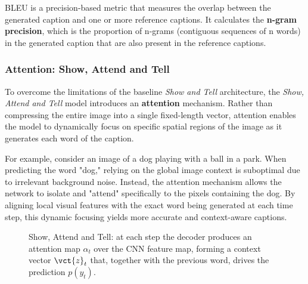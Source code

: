 BLEU is a precision-based metric that measures the overlap between the generated caption and one or more reference captions.
It calculates the \textbf{n-gram precision}, which is the proportion of n-grams (contiguous sequences of n words)
in the generated caption that are also present in the reference captions.


\subsubsection{Attention: Show, Attend and Tell}

To overcome the limitations of the baseline \textit{Show and Tell} architecture, the \textit{Show, Attend and Tell} model introduces an \textbf{attention} mechanism.
Rather than compressing the entire image into a single fixed-length vector, attention enables the model to dynamically focus on specific spatial regions of the image as it generates each word of the caption.

For example, consider an image of a dog playing with a ball in a park.
When predicting the word "dog," relying on the global image context is suboptimal due to irrelevant background noise.
Instead, the attention mechanism allows the network to isolate and "attend" specifically to the pixels containing the dog.
By aligning local visual features with the exact word being generated at each time step, this dynamic focusing yields more accurate and context-aware captions.

\begin{figure}[H]
    \centering
    
    \caption{Show, Attend and Tell: at each step the decoder produces an attention map $\alpha_t$ over the CNN feature map, forming a context vector $\vct{z}_t$ that, together with the previous word, drives the prediction $p(y_t)$.}
\end{figure}

